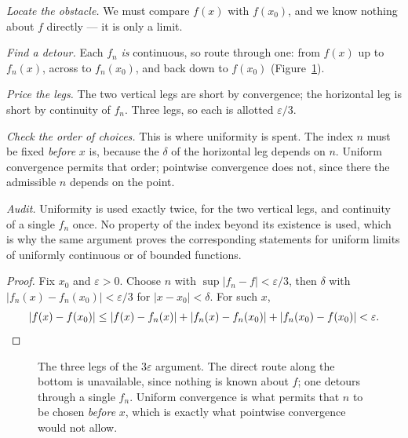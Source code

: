 \begin{flow}
  \item \textit{Locate the obstacle.} We must compare $f(x)$ with $f(x_0)$,
        and we know nothing about $f$ directly --- it is only a limit.
  \item \textit{Find a detour.} Each $f_n$ \emph{is} continuous, so route
        through one: from $f(x)$ up to $f_n(x)$, across to $f_n(x_0)$, and
        back down to $f(x_0)$ (Figure~\ref{fig:3eps}).
  \item \textit{Price the legs.} The two vertical legs are short by
        convergence; the horizontal leg is short by continuity of $f_n$.
        Three legs, so each is allotted $\varepsilon/3$.
  \item \textit{Check the order of choices.} This is where uniformity is
        spent. The index $n$ must be fixed \emph{before} $x$ is, because the
        $\delta$ of the horizontal leg depends on $n$. Uniform convergence
        permits that order; pointwise convergence does not, since there the
        admissible $n$ depends on the point.
  \item \textit{Audit.} Uniformity is used exactly twice, for the two
        vertical legs, and continuity of a single $f_n$ once. No property of
        the index beyond its existence is used, which is why the same
        argument proves the corresponding statements for uniform limits of
        uniformly continuous or of bounded functions.
\end{flow}

\begin{proof}
Fix $x_0$ and $\varepsilon>0$. Choose $n$ with
$\sup|f_n-f|<\varepsilon/3$, then $\delta$ with
$|f_n(x)-f_n(x_0)|<\varepsilon/3$ for $|x-x_0|<\delta$. For such $x$,
\[ |f(x)-f(x_0)| \le |f(x)-f_n(x)|+|f_n(x)-f_n(x_0)|+|f_n(x_0)-f(x_0)|
   < \varepsilon. \qedhere \]
\end{proof}

\begin{figure}[htbp]
\centering
{}
\caption{The three legs of the $3\varepsilon$ argument. The direct route
along the bottom is unavailable, since nothing is known about $f$; one
detours through a single $f_n$. Uniform convergence is what permits that $n$
to be chosen \emph{before} $x$, which is exactly what pointwise convergence
would not allow.}
\label{fig:3eps}
\end{figure}

